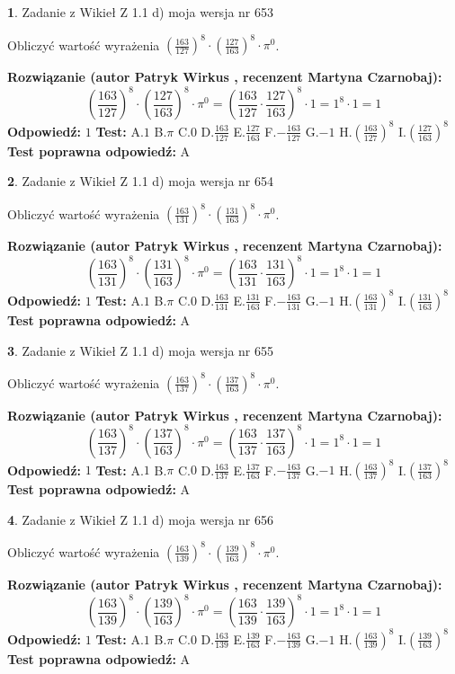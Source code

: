 \documentclass[12pt, a4paper]{article}
\theoremstyle{definition} %
\newtheorem{zad}{}
\newcommand{\zadStart}[1]{\begin{zad}#1\newline}
\newcommand{\zadStop}{\end{zad}}
\newcommand{\rozwStart}[2]{\noindent \textbf{Rozwiązanie (autor #1 , recenzent #2): }\newline}
\newcommand{\rozwStop}{\newline}
\newcommand{\odpStart}{\noindent \textbf{Odpowiedź:}\newline}
\newcommand{\odpStop}{\newline}
\newcommand{\testStart}{\noindent \textbf{Test:}\newline}
\newcommand{\testStop}{\newline}
\newcommand{\kluczStart}{\noindent \textbf{Test poprawna odpowiedź:}\newline}
\newcommand{\kluczStop}{\newline}
\begin{document}
\zadStart{Zadanie z Wikieł Z 1.1 d) moja wersja nr 653}

Obliczyć wartość wyrażenia $(\frac{163}{127})^{8} \cdot (\frac{127}{163})^{8} \cdot \pi^{0}$.
\zadStop
\rozwStart{Patryk Wirkus}{Martyna Czarnobaj}
$$(\frac{163}{127})^{8} \cdot (\frac{127}{163})^{8} \cdot \pi^{0} = (\frac{163}{127} \cdot \frac{127}{163})^{8} \cdot 1 = 1^{8} \cdot 1 = 1$$
\rozwStop
\odpStart
$1$
\odpStop
\testStart
A.$1$ B.$\pi$ C.$0$ D.$\frac{163}{127}$ E.$\frac{127}{163}$
F.$-\frac{163}{127}$ G.$-1$
H.$(\frac{163}{127})^{8}$
I.$(\frac{127}{163})^{8}$
\testStop
\kluczStart
A
\kluczStop



\zadStart{Zadanie z Wikieł Z 1.1 d) moja wersja nr 654}

Obliczyć wartość wyrażenia $(\frac{163}{131})^{8} \cdot (\frac{131}{163})^{8} \cdot \pi^{0}$.
\zadStop
\rozwStart{Patryk Wirkus}{Martyna Czarnobaj}
$$(\frac{163}{131})^{8} \cdot (\frac{131}{163})^{8} \cdot \pi^{0} = (\frac{163}{131} \cdot \frac{131}{163})^{8} \cdot 1 = 1^{8} \cdot 1 = 1$$
\rozwStop
\odpStart
$1$
\odpStop
\testStart
A.$1$ B.$\pi$ C.$0$ D.$\frac{163}{131}$ E.$\frac{131}{163}$
F.$-\frac{163}{131}$ G.$-1$
H.$(\frac{163}{131})^{8}$
I.$(\frac{131}{163})^{8}$
\testStop
\kluczStart
A
\kluczStop



\zadStart{Zadanie z Wikieł Z 1.1 d) moja wersja nr 655}

Obliczyć wartość wyrażenia $(\frac{163}{137})^{8} \cdot (\frac{137}{163})^{8} \cdot \pi^{0}$.
\zadStop
\rozwStart{Patryk Wirkus}{Martyna Czarnobaj}
$$(\frac{163}{137})^{8} \cdot (\frac{137}{163})^{8} \cdot \pi^{0} = (\frac{163}{137} \cdot \frac{137}{163})^{8} \cdot 1 = 1^{8} \cdot 1 = 1$$
\rozwStop
\odpStart
$1$
\odpStop
\testStart
A.$1$ B.$\pi$ C.$0$ D.$\frac{163}{137}$ E.$\frac{137}{163}$
F.$-\frac{163}{137}$ G.$-1$
H.$(\frac{163}{137})^{8}$
I.$(\frac{137}{163})^{8}$
\testStop
\kluczStart
A
\kluczStop



\zadStart{Zadanie z Wikieł Z 1.1 d) moja wersja nr 656}

Obliczyć wartość wyrażenia $(\frac{163}{139})^{8} \cdot (\frac{139}{163})^{8} \cdot \pi^{0}$.
\zadStop
\rozwStart{Patryk Wirkus}{Martyna Czarnobaj}
$$(\frac{163}{139})^{8} \cdot (\frac{139}{163})^{8} \cdot \pi^{0} = (\frac{163}{139} \cdot \frac{139}{163})^{8} \cdot 1 = 1^{8} \cdot 1 = 1$$
\rozwStop
\odpStart
$1$
\odpStop
\testStart
A.$1$ B.$\pi$ C.$0$ D.$\frac{163}{139}$ E.$\frac{139}{163}$
F.$-\frac{163}{139}$ G.$-1$
H.$(\frac{163}{139})^{8}$
I.$(\frac{139}{163})^{8}$
\testStop
\kluczStart
A
\kluczStop
\end{document}
